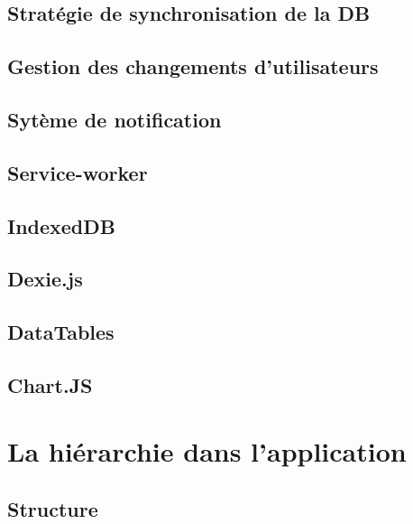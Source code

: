 \documentclass{EPL-master-thesis-covers-FR}
\begin{document}
			\subsection{Stratégie de synchronisation de la DB}
			
			
			\subsection{Gestion des changements d'utilisateurs}		
			
			
			\subsection{Sytème de notification}	
						

			\subsection*{Service-worker}

		
			\subsection*{IndexedDB}

					

			\subsection*{Dexie.js}
				

			\subsection*{DataTables}

			

			\subsection*{Chart.JS}
				
				

		\section{La hiérarchie dans l'application}


			\subsection*{Structure}
\end{document}
